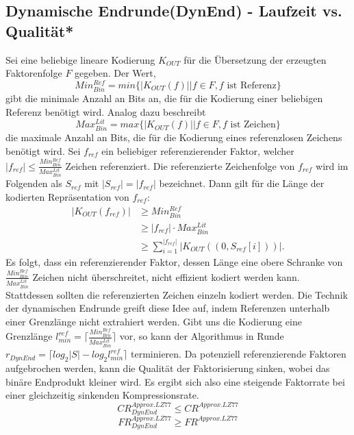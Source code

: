 \subsection{Dynamische Endrunde(DynEnd) - Laufzeit vs. Qualität*}
Sei eine beliebige lineare Kodierung $K_{OUT}$ für die Übersetzung der erzeugten Faktorenfolge $F$ gegeben. Der Wert,
\begin{equation}
    Min^{Ref}_{Bin}=min\{|K_{OUT}(f)| | f \in F ,f \text{ ist Referenz}\}
\end{equation}
gibt die minimale Anzahl an Bits an, die für die Kodierung einer beliebigen Referenz benötigt wird. Analog dazu beschreibt
\begin{equation}
    Max^{Lit}_{Bin}=max\{|K_{OUT}(f)| | f \in F, f \text{ ist Zeichen}\}
\end{equation}
die maximale Anzahl an Bits, die für die Kodierung eines referenzlosen Zeichens benötigt wird. Sei $f_{ref}$ ein beliebiger referenzierender Faktor, welcher 
$|f_{ref}|\leq\frac{Min^{Ref}_{Bin}}{Max^{Lit}_{Bin}}$ Zeichen referenziert. Die referenzierte Zeichenfolge von $f_{ref}$ wird im Folgenden als $S_{ref}$ mit $|S_{ref}|=|f_{ref}|$ bezeichnet.
Dann gilt für die Länge der kodierten Repräsentation von $f_{ref}$:
\begin{equation}
\begin{split}
    |K_{OUT}(f_{ref})| & \geq Min^{Ref}_{Bin}\\
    & \geq |f_{ref}| \cdot Max^{Lit}_{Bin}\\
    & \geq \sum_{i=1}^{|f_{ref}|} |K_{OUT}((0, S_{ref}[i]))|.
\end{split}
\end{equation}
Es folgt, dass ein referenzierender Faktor, dessen Länge eine obere Schranke von $\frac{Min^{Ref}_{Bin}}{Max^{Lit}_{Bin}}$ Zeichen nicht überschreitet, nicht effizient kodiert werden kann.
Stattdessen sollten die referenzierten Zeichen einzeln kodiert werden. Die Technik der dynamischen Endrunde greift diese Idee auf, indem Referenzen unterhalb einer Grenzlänge nicht extrahiert
werden. Gibt uns die Kodierung eine Grenzlänge $l^{ref}_{min} = \lceil\frac{Min^{Ref}_{Bin}}{Max^{Lit}_{Bin}}\rceil$ vor, so kann der Algorithmus in Runde 
$r_{DynEnd} = \lceil log_2{|S|}-log_2{l^{ref}_{min}} \rceil$ terminieren. Da potenziell referenzierende Faktoren aufgebrochen werden, kann die Qualität der Faktorisierung sinken, wobei das 
binäre Endprodukt kleiner wird. Es ergibt sich also eine steigende Faktorrate bei einer gleichzeitig sinkenden Kompressionsrate.
\begin{equation}
    CR^{Approx.LZ77}_{DynEnd} \leq CR^{Approx.LZ77}
\end{equation}
\begin{equation}
    FR^{Approx.LZ77}_{DynEnd} \geq FR^{Approx.LZ77}
\end{equation}

